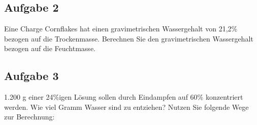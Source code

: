 \documentclass[a4paper,11pt]{article}
\newif\ifshowme
\begin{document}
\ifshowme
\antwort{
\begin{align*}
\frac{7,5}{92,5}  \qquad = \qquad 0,081 \qquad \hat{=} \qquad 8,11 \%
\end{align*}

}
\else
\fi


\subsection*{Aufgabe 2}
Eine Charge Cornflakes hat einen gravimetrischen Wassergehalt von 21,2\% bezogen auf die
Trockenmasse. Berechnen Sie den gravimetrischen Wassergehalt bezogen auf die
Feuchtmasse.

\ifshowme
\antwort{
\begin{align*}
\frac{21,2}{121,2} \qquad = \qquad 17,5 \%
\end{align*}
}
\pagebreak
\else
\fi



\subsection*{Aufgabe 3}
1.200 g einer 24\%igen Lösung sollen durch Eindampfen auf 60\% konzentriert werden. Wie viel
Gramm Wasser sind zu entziehen? Nutzen Sie folgende Wege zur Berechnung:
\end{document}
